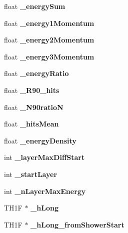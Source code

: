 \begin{DoxyCompactItemize}
\item 
float {\bfseries \-\_\-energy\-Sum}\label{classHcalTMVAProcessor_a00bc9323d52765ce8d2ab4d4b2a6d48e}

\item 
float {\bfseries \-\_\-energy1\-Momentum}\label{classHcalTMVAProcessor_a3b52255ba9b63b79104ffe8b1ecc7421}

\item 
float {\bfseries \-\_\-energy2\-Momentum}\label{classHcalTMVAProcessor_a42ab7b04ad9c379e7fec2205e8136f0d}

\item 
float {\bfseries \-\_\-energy3\-Momentum}\label{classHcalTMVAProcessor_a82308de405661fa309717629b2e28cef}

\item 
float {\bfseries \-\_\-energy\-Ratio}\label{classHcalTMVAProcessor_a30c123fdb9ec6ec83325426a8e7c300f}

\item 
float {\bfseries \-\_\-\-R90\-\_\-hits}\label{classHcalTMVAProcessor_a1333659172590a47aeec97c5dffbfebb}

\item 
float {\bfseries \-\_\-\-N90ratio\-N}\label{classHcalTMVAProcessor_ab4b965bab5e25b3f61f18228613ad7cb}

\item 
float {\bfseries \-\_\-hits\-Mean}\label{classHcalTMVAProcessor_a173a05b0ad67e93838bcdcb68d050622}

\item 
float {\bfseries \-\_\-energy\-Density}\label{classHcalTMVAProcessor_a397d6fba47101360c617b11826ee83f9}

\item 
int {\bfseries \-\_\-layer\-Max\-Diff\-Start}\label{classHcalTMVAProcessor_a6f6692cd1c48be72ca7278b8254cf83d}

\item 
int {\bfseries \-\_\-start\-Layer}\label{classHcalTMVAProcessor_aabb429e5a6a10496999dda602b541006}

\item 
int {\bfseries \-\_\-n\-Layer\-Max\-Energy}\label{classHcalTMVAProcessor_a9fadcc3533a11de7aabcdf1a3e42612f}

\item 
T\-H1\-F $\ast$ {\bfseries \-\_\-h\-Long}\label{classHcalTMVAProcessor_af3334ea5f23a41a21e77968c72b79b0f}

\item 
T\-H1\-F $\ast$ {\bfseries \-\_\-h\-Long\-\_\-from\-Shower\-Start}\label{classHcalTMVAProcessor_a3b67b4268924aa76cc593085f3a3bc57}


\end{DoxyCompactItemize}
